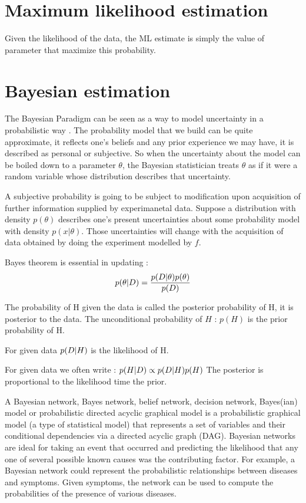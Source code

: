 \section{Maximum {likelihood} estimation}

Given the likelihood of the data, the ML estimate is simply the value of parameter that maximize this probability.

\section{Bayesian estimation}

The Bayesian Paradigm can be seen as a way to model uncertainty in a probabilistic way .
The probability model that we build can be quite approximate, it reflects one's beliefs and any \gls{prior} experience we may have, it is described as personal or subjective.
So when the uncertainty about the model can be boiled down to a parameter $\theta$, the Bayesian statistician treats $\theta$ as if it were a random variable whose distribution describes that uncertainty.

A subjective probability is going to be subject to modification upon acquisition of further information supplied by experimanetal data.
Suppose a distribution with density $p(\theta)$ describes one's present uncertainties about some probability model with density $p(x|\theta)$.
Those uncertainties will change with the acquisition of data obtained by doing the experiment modelled by $f$.

Bayes theorem is essential in updating :
\begin{equation}
	p(\theta|D)=\frac{p(D|\theta)p(\theta)}{p(D)}
\end{equation}

The probability of H given the data is called the posterior
probability of H, it is \gls{posterior} to the data.
The unconditional probability of $H$ : $p(H)$ is the prior
probability of H.

For given data $p(D|H)$ is the \gls{likelihood} of H.

For given data we often write :
$p(H|D) \propto p(D|H) p(H)$
The \gls{posterior} is proportional to the \gls{likelihood} time the \gls{prior}.

A Bayesian network, Bayes network, belief network, decision network, Bayes(ian) model or probabilistic directed acyclic graphical model is a probabilistic graphical model (a type of statistical model) that represents a set of variables and their conditional dependencies via a directed acyclic graph (DAG). Bayesian networks are ideal for taking an event that occurred and predicting the \gls{likelihood} that any one of several possible known causes was the contributing factor. For example, a Bayesian network could represent the probabilistic relationships between diseases and symptoms. Given symptoms, the network can be used to compute the probabilities of the presence of various diseases. 

